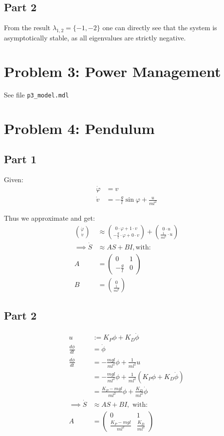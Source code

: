 \documentclass[a4paper,parskip,headheight=38pt]{scrartcl} %
\begin{document}
\subsection*{Part 2}

From the result $\lambda_{1,2} = \{-1, -2\}$ one can directly see that
the system is asymptotically stable, as all eigenvalues are strictly
negative.


 \pagebreak{}
\section*{Problem 3: Power Management}

See file \texttt{p3\_model.mdl}


\section*{Problem 4: Pendulum}

\subsection*{Part 1}

Given:
\begin{align*}
    \dot{\varphi} &= v \\
    \dot{v} &= - \frac{g}{l} \sin \varphi + \frac{u}{ml^2}
\end{align*}

Thus we approximate and get:
\begin{align*}
    \binom{\dot{\varphi}}{\dot{v}} &\approx \binom{0 \cdot \varphi + 1 \cdot v}{- \frac{g}{l} \cdot \varphi + 0 \cdot v} + \binom{0 \cdot u}{\frac{1}{ml^2} \cdot u} \\
    \implies \dot{S} &\approx AS + BI, \text{with:} \\
    A &= \left( \begin{array}{cc} 0 & 1 \\ -\frac{g}{l} & 0 \end{array} \right) \\
    B &= \binom{0}{\frac{1}{ml^2}}
\end{align*}

\subsection*{Part 2}
\begin{align*}
	u &:= K_P \phi + K_D \dot{\phi} \\
	\frac{d \phi}{d t} &= \dot{\phi} \\
	\frac{d \dot{\phi}}{d t} &= - \frac{mgl}{ml^2} \phi + \frac{1}{ml^2}u \\
	&= - \frac{mgl}{ml^2} \phi + \frac{1}{ml^2} (K_P \phi + K_D \dot{\phi}) \\
	&= \frac{K_P-mgl}{ml^2}\phi + \frac{K_D}{ml^2}\dot{\phi} \\
	\implies \dot{S} &\approx AS + BI, \text{ with:} \\
    A &= \left( \begin{array}{cc} 0 & 1 \\ \frac{K_P-mgl}{ml^2} & \frac{K_D}{ml^2} \end{array} \right)
\end{align*}
\end{document}
